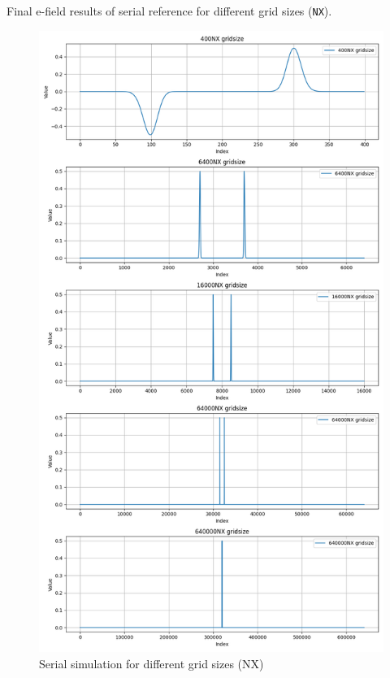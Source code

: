 \documentclass[a4paper,10pt]{article}
\begin{document}
Final e-field results of serial reference for different grid sizes (\verb|NX|).
\begin{figure}[H]
  \centering
  \includegraphics[height=0.95\textheight]{../images/5_test/display_field_subplots.png}
  \caption{Serial simulation for different grid sizes (NX)}
  \label{fig:5_serial_verification}
\end{figure}

\end{document}
